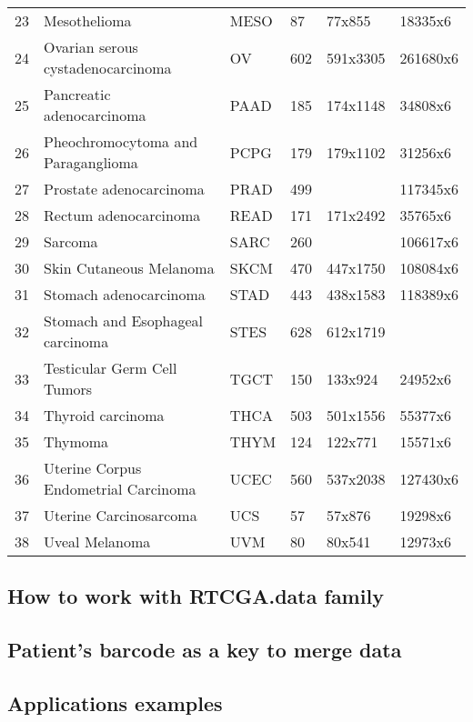 \begin{table}[ht]
\begin{tabular}{rlllll}
  23 & Mesothelioma & MESO & 87 & 77x855 & 18335x6 \\ 
  24 & Ovarian serous cystadenocarcinoma & OV & 602 & 591x3305 & 261680x6 \\ 
  25 & Pancreatic adenocarcinoma & PAAD & 185 & 174x1148 & 34808x6 \\ 
  26 & Pheochromocytoma and Paraganglioma & PCPG & 179 & 179x1102 & 31256x6 \\ 
  27 & Prostate adenocarcinoma & PRAD & 499 &  & 117345x6 \\ 
  28 & Rectum adenocarcinoma & READ & 171 & 171x2492 & 35765x6 \\ 
  29 & Sarcoma & SARC & 260 &  & 106617x6 \\ 
  30 & Skin Cutaneous Melanoma & SKCM & 470 & 447x1750 & 108084x6 \\ 
  31 & Stomach adenocarcinoma & STAD & 443 & 438x1583 & 118389x6 \\ 
  32 & Stomach and Esophageal carcinoma & STES & 628 & 612x1719 &  \\ 
  33 & Testicular Germ Cell Tumors & TGCT & 150 & 133x924 & 24952x6 \\ 
  34 & Thyroid carcinoma & THCA & 503 & 501x1556 & 55377x6 \\ 
  35 & Thymoma & THYM & 124 & 122x771 & 15571x6 \\ 
  36 & Uterine Corpus Endometrial Carcinoma & UCEC & 560 & 537x2038 & 127430x6 \\ 
  37 & Uterine Carcinosarcoma & UCS & 57 & 57x876 & 19298x6 \\ 
  38 & Uveal Melanoma & UVM & 80 & 80x541 & 12973x6 \\ 
   \bottomrule
\end{tabular}
\end{table}

\normalsize

\subsection{How to work with RTCGA.data
family}\label{how-to-work-with-rtcga.data-family}

\subsection{Patient's barcode as a key to merge
data}\label{patients-barcode-as-a-key-to-merge-data}

\subsection{Applications examples}\label{applications-examples}

